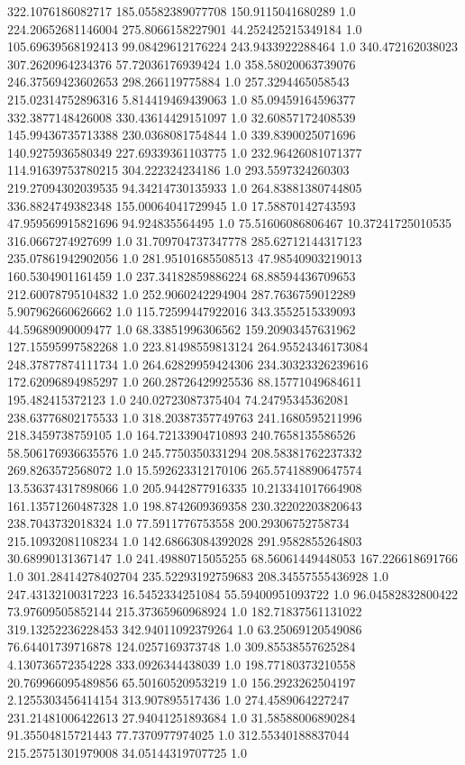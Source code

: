 322.1076186082717	185.05582389077708	150.9115041680289	1.0
224.20652681146004	275.8066158227901	44.252425215349184	1.0
105.69639568192413	99.08429612176224	243.9433922288464	1.0
340.472162038023	307.2620964234376	57.72036176939424	1.0
358.58020063739076	246.37569423602653	298.266119775884	1.0
257.3294465058543	215.02314752896316	5.814419469439063	1.0
85.09459164596377	332.3877148426008	330.43614429151097	1.0
32.60857172408539	145.99436735713388	230.0368081754844	1.0
339.8390025071696	140.9275936580349	227.69339361103775	1.0
232.96426081071377	114.91639753780215	304.222324234186	1.0
293.5597324260303	219.27094302039535	94.34214730135933	1.0
264.83881380744805	336.8824749382348	155.00064041729945	1.0
17.58870142743593	47.959569915821696	94.924835564495	1.0
75.51606086806467	10.37241725010535	316.0667274927699	1.0
31.709704737347778	285.62712144317123	235.07861942902056	1.0
281.95101685508513	47.98540903219013	160.5304901161459	1.0
237.34182859886224	68.88594436709653	212.60078795104832	1.0
252.9060242294904	287.7636759012289	5.907962660626662	1.0
115.72599447922016	343.3552515339093	44.59689090009477	1.0
68.33851996306562	159.20903457631962	127.15595997582268	1.0
223.81498559813124	264.95524346173084	248.37877874111734	1.0
264.62829959424306	234.30323326239616	172.62096894985297	1.0
260.28726429925536	88.15771049684611	195.482415372123	1.0
240.02723087375404	74.24795345362081	238.63776802175533	1.0
318.20387357749763	241.1680595211996	218.3459738759105	1.0
164.72133904710893	240.7658135586526	58.506176936635576	1.0
245.7750350331294	208.58381762237332	269.8263572568072	1.0
15.592623312170106	265.57418890647574	13.536374317898066	1.0
205.9442877916335	10.213341017664908	161.13571260487328	1.0
198.8742609369358	230.32202203820643	238.7043732018324	1.0
77.5911776753558	200.29306752758734	215.10932081108234	1.0
142.68663084392028	291.9582855264803	30.68990131367147	1.0
241.49880715055255	68.56061449448053	167.226618691766	1.0
301.28414278402704	235.52293192759683	208.34557555436928	1.0
247.43132100317223	16.5452334251084	55.59400951093722	1.0
96.04582832800422	73.97609505852144	215.37365960968924	1.0
182.71837561131022	319.13252236228453	342.94011092379264	1.0
63.25069120549086	76.64401739716878	124.0257169373748	1.0
309.85538557625284	4.130736572354228	333.0926344438039	1.0
198.77180373210558	20.769966095489856	65.50160520953219	1.0
156.2923262504197	2.1255303456414154	313.907895517436	1.0
274.4589064227247	231.21481006422613	27.94041251893684	1.0
31.58588006890284	91.35504815721443	77.7370977974025	1.0
312.55340188837044	215.25751301979008	34.05144319707725	1.0
